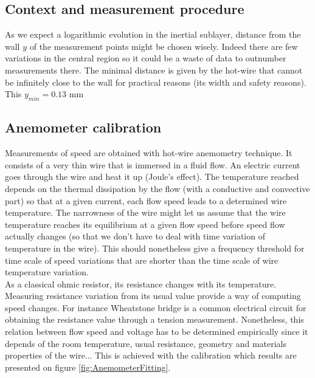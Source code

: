 \documentclass[12pt]{article}
\begin{document}
\subsection{Context and measurement procedure}



As we expect a logarithmic evolution in the inertial sublayer, distance from the wall $y$ of the measurement points might be chosen wisely. Indeed there are few variations in the central region so it could be a waste of data to outnumber measurements there. The minimal distance is given by the hot-wire that cannot be infinitely close to the wall for practical reasons (its width and safety reasons). This $y_{min} = 0.13$ \si{mm}\\


\subsection{Anemometer calibration}

Measurements of speed are obtained with hot-wire anemometry technique. It consists of a very thin wire that is immersed in a fluid flow. An electric current goes through the wire and heat it up (Joule's effect). The temperature reached depends on the thermal dissipation by the flow (with a conductive and convective part) so that at a given current, each flow speed leads to a determined wire temperature. The narrowness of the wire might let us assume that the wire temperature reaches its equilibrium at a given flow speed before speed flow actually changes (so that we don't have to deal with time variation of temperature in the wire). This should nonetheless give a frequency threshold for time scale of speed variations that are shorter than the time scale of wire temperature variation.\\

As a classical ohmic resistor, its resistance changes with its temperature. Measuring resistance variation from its usual value provide a way of computing speed changes. For instance Wheatstone bridge is a common electrical circuit for obtaining the resistance value through a tension measurement. Nonetheless, this relation between flow speed and voltage has to be determined empirically since it depends of the room temperature, usual resistance, geometry and materials properties of the wire... This is achieved with the calibration which results are presented on figure \ref{fig:AnemometerFitting}.\\ 
\end{document}
